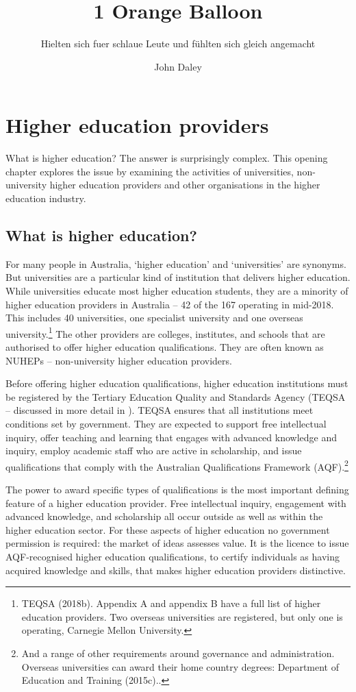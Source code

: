 \documentclass{grattan}
\author{John Daley}
\title{1 Orange Balloon}
\subtitle{Hielten sich fuer schlaue Leute und fühlten sich gleich angemacht}
\begin{document}
\contentspage
\listoffigures
\listoftables


\chapter{Higher education providers }\label{chap:higher-education-providers}

What is higher education? The answer is surprisingly complex. This opening chapter explores the issue by examining the activities of universities, non-university higher education providers and other organisations in the higher education industry.

%
\section{What is higher education?}\label{sec:what-is-higher-education}

For many people in Australia, `higher education' and `universities' are synonyms. But universities are a particular kind of institution that delivers higher education. While universities educate most higher education students, they are a minority of higher education providers in Australia -- 42 of the 167 operating in mid-2018. This includes 40 universities, one specialist university and one overseas university.\footnote{TEQSA (2018b). Appendix A and appendix B have a full list of higher education providers. Two overseas universities are registered, but only one is operating, Carnegie Mellon University.} The other providers are colleges, institutes, and schools that are authorised to offer higher education qualifications. They are often known as NUHEPs -- non-university higher education providers.

Before offering higher education qualifications, higher education institutions must be registered by the Tertiary Education Quality and Standards Agency (TEQSA -- discussed in more detail in ). TEQSA ensures that all institutions meet conditions set by government. They are expected to support free intellectual inquiry, offer teaching and learning that engages with advanced knowledge and inquiry, employ academic staff who are active in scholarship, and issue qualifications that comply with the Australian Qualifications Framework (AQF).\footnote{And a range of other requirements around governance and administration. Overseas universities can award their home country degrees: Department of Education and Training (2015c)..}

The power to award specific types of qualifications is the most important defining feature of a higher education provider. Free intellectual inquiry, engagement with advanced knowledge, and scholarship all occur outside as well as within the higher education sector. For these aspects of higher education no government permission is required: the market of ideas assesses value. It is the licence to issue AQF-recognised higher education qualifications, to certify individuals as having acquired knowledge and skills, that makes higher education providers distinctive.
\end{document}
